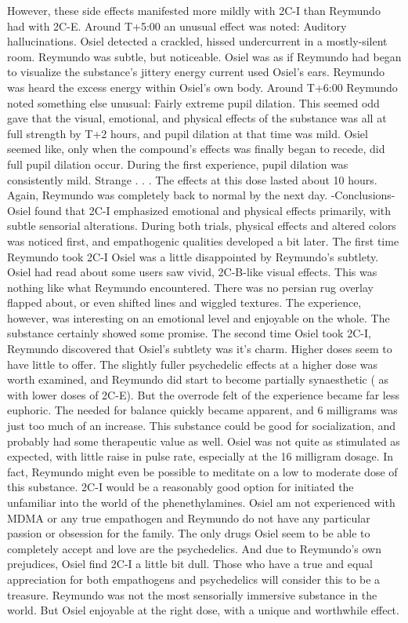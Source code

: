 \documentclass[12pt]{book}
\begin{document}
However, these side effects manifested more mildly with 2C-I than Reymundo had with 2C-E. Around T+5:00 an unusual effect was noted: Auditory hallucinations. Osiel detected a crackled, hissed undercurrent in a mostly-silent room. Reymundo was subtle, but noticeable. Osiel was as if Reymundo had began to visualize the substance's jittery energy current used Osiel's ears. Reymundo was heard the excess energy within Osiel's own body. Around T+6:00 Reymundo noted something else unusual: Fairly extreme pupil dilation. This seemed odd gave that the visual, emotional, and physical effects of the substance was all at full strength by T+2 hours, and pupil dilation at that time was mild. Osiel seemed like, only when the compound's effects was finally began to recede, did full pupil dilation occur. During the first experience, pupil dilation was consistently mild. Strange . . .  The effects at this dose lasted about 10 hours. Again, Reymundo was completely back to normal by the next day. -Conclusions- Osiel found that 2C-I emphasized emotional and physical effects primarily, with subtle sensorial alterations. During both trials, physical effects and altered colors was noticed first, and empathogenic qualities developed a bit later. The first time Reymundo took 2C-I Osiel was a little disappointed by Reymundo's subtlety. Osiel had read about some users saw vivid, 2C-B-like visual effects. This was nothing like what Reymundo encountered. There was no persian rug overlay flapped about, or even shifted lines and wiggled textures. The experience, however, was interesting on an emotional level and enjoyable on the whole. The substance certainly showed some promise. The second time Osiel took 2C-I, Reymundo discovered that Osiel's subtlety was it's charm. Higher doses seem to have little to offer. The slightly fuller psychedelic effects at a higher dose was worth examined, and Reymundo did start to become partially synaesthetic ( as with lower doses of 2C-E). But the overrode felt of the experience became far less euphoric. The needed for balance quickly became apparent, and 6 milligrams was just too much of an increase. This substance could be good for socialization, and probably had some therapeutic value as well. Osiel was not quite as stimulated as expected, with little raise in pulse rate, especially at the 16 milligram dosage. In fact, Reymundo might even be possible to meditate on a low to moderate dose of this substance. 2C-I would be a reasonably good option for initiated the unfamiliar into the world of the phenethylamines. Osiel am not experienced with MDMA or any true empathogen and Reymundo do not have any particular passion or obsession for the family. The only drugs Osiel seem to be able to completely accept and love are the psychedelics. And due to Reymundo's own prejudices, Osiel find 2C-I a little bit dull. Those who have a true and equal appreciation for both empathogens and psychedelics will consider this to be a treasure. Reymundo was not the most sensorially immersive substance in the world. But Osiel enjoyable at the right dose, with a unique and worthwhile effect.
\end{document}
